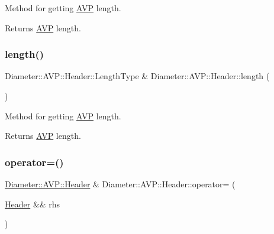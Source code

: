 Method for getting \hyperlink{classDiameter_1_1AVP}{A\+VP} length. 

\begin{DoxyReturn}{Returns}
\hyperlink{classDiameter_1_1AVP}{A\+VP} length. 
\end{DoxyReturn}
\mbox{\label{classDiameter_1_1AVP_1_1Header_ab2699d4d3cdc98d9649df77e7a546231}} 
\subsubsection{\texorpdfstring{length()}{length()}\hspace{0.1cm}{\footnotesize\ttfamily [2/2]}}
{\footnotesize\ttfamily Diameter\+::\+A\+V\+P\+::\+Header\+::\+Length\+Type \& Diameter\+::\+A\+V\+P\+::\+Header\+::length (\begin{DoxyParamCaption}{ }\end{DoxyParamCaption})}



Method for getting \hyperlink{classDiameter_1_1AVP}{A\+VP} length. 

\begin{DoxyReturn}{Returns}
\hyperlink{classDiameter_1_1AVP}{A\+VP} length. 
\end{DoxyReturn}
\mbox{\label{classDiameter_1_1AVP_1_1Header_a3798fa2ecf6fb48e3d54af4fb874b12c}} 
\subsubsection{\texorpdfstring{operator=()}{operator=()}\hspace{0.1cm}{\footnotesize\ttfamily [1/2]}}
{\footnotesize\ttfamily \hyperlink{classDiameter_1_1AVP_1_1Header}{Diameter\+::\+A\+V\+P\+::\+Header} \& Diameter\+::\+A\+V\+P\+::\+Header\+::operator= (\begin{DoxyParamCaption}\item[{\hyperlink{classDiameter_1_1AVP_1_1Header}{Header} \&\&}]{rhs }\end{DoxyParamCaption})\hspace{0.3cm}{\ttfamily [noexcept]}}



